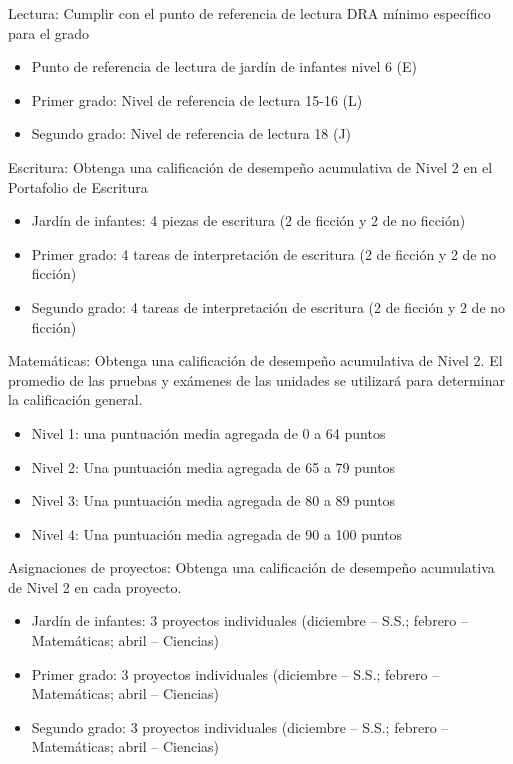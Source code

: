 \documentclass[12pt,letterpaper]{article}
\begin{document}
Lectura: Cumplir con el punto de referencia de lectura DRA mínimo específico para el grado\begin{itemize}
\item Punto de referencia de lectura de jardín de infantes nivel 6 (E)
\item Primer grado: Nivel de referencia de lectura 15-16 (L)
\item Segundo grado: Nivel de referencia de lectura 18 (J)
\end{itemize}

Escritura: Obtenga una calificación de desempeño acumulativa de Nivel 2 en el Portafolio de Escritura
\begin{itemize}
\item Jardín de infantes: 4 piezas de escritura (2 de ficción y 2 de no ficción)
\item Primer grado: 4 tareas de interpretación de escritura (2 de ficción y 2 de no ficción)
\item Segundo grado: 4 tareas de interpretación de escritura (2 de ficción y 2 de no ficción)
\end{itemize}

Matemáticas: Obtenga una calificación de desempeño acumulativa de Nivel 2. El promedio de las pruebas y exámenes de las unidades se utilizará para determinar la calificación general.
\begin{itemize}
\item Nivel 1: una puntuación media agregada de 0 a 64 puntos
\item Nivel 2: Una puntuación media agregada de 65 a 79 puntos
\item Nivel 3: Una puntuación media agregada de 80 a 89 puntos
\item Nivel 4: Una puntuación media agregada de 90 a 100 puntos
\end{itemize}
\pagebreak
\pagebreak
\vspace*{1.5cm}
Asignaciones de proyectos: Obtenga una calificación de desempeño acumulativa de Nivel 2 en cada proyecto.
\begin{itemize}
\item Jardín de infantes: 3 proyectos individuales (diciembre – S.S.; febrero – Matemáticas; abril – Ciencias)
\item Primer grado: 3 proyectos individuales (diciembre – S.S.; febrero – Matemáticas; abril – Ciencias)
\item Segundo grado: 3 proyectos individuales (diciembre – S.S.; febrero – Matemáticas; abril – Ciencias)
\end{itemize}
\end{document}
